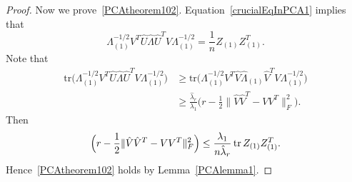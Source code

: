 \begin{proof}
    Now we prove~\eqref{PCAtheorem102}.
    Equation~\eqref{crucialEqInPCA1} implies that
    \begin{equation}\label{crucialEqInPCA2}
        \Lambda^{-1/2}_{(1)}V^T \hat{U}\hat{\Lambda}\hat{U}^T V\Lambda^{-1/2}_{(1)}=
        \frac{1}{n}{Z}_{(1)}{Z}_{(1)}^T.
    \end{equation}
    Note that
    \begin{equation}
        \begin{aligned}
        \mathrm{tr}\big(\Lambda^{-1/2}_{(1)}V^T \hat{U}\hat{\Lambda}\hat{U}^T V\Lambda^{-1/2}_{(1)}\big)
            &\geq
        \mathrm{tr}\big(\Lambda^{-1/2}_{(1)}V^T \hat{V}\hat{\Lambda}_{(1)}\hat{V}^T V\Lambda^{-1/2}_{(1)}\big)
            \\
            &\geq
            \frac{\hat{\lambda}_r}{\lambda_1}\Big(r-\frac{1}{2}\|\hat{V}\hat{V}^T-VV^T\|^2_F\Big).
        \end{aligned}
    \end{equation}
Then
$$
            \Big(r-\frac{1}{2}\|\hat{V}\hat{V}^T-VV^T\|^2_F\Big)\leq
\frac{\lambda_1}{n\hat{\lambda}_r}\operatorname{tr} Z_{(1)}Z_{(1)}^T.
$$
Hence~\eqref{PCAtheorem102} holds by Lemma~\ref{PCAlemma1}.

\end{proof}

